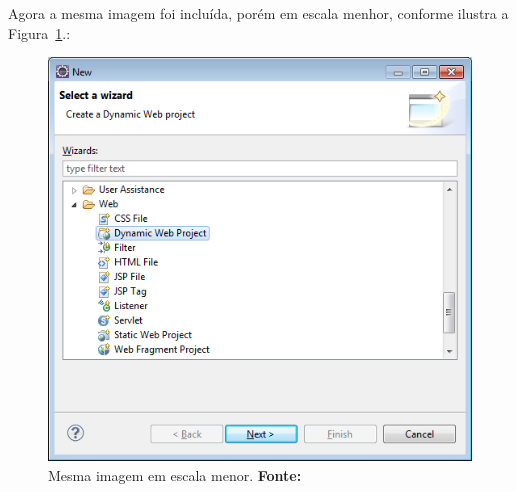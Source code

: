 \par Agora a mesma imagem foi incluída, porém em escala menhor, conforme ilustra a Figura~\ref{fig:exemplo2}.:

\begin{figure}[h!]
  \centerline{\includegraphics[scale=0.25]{./imagens/apendice_img1.png}}
  \caption[Mesma imagem em escala menor]
          {Mesma imagem em escala menor. \textbf{Fonte:} \cite{correa2003plantas}}
\label{fig:exemplo2}
\end{figure}